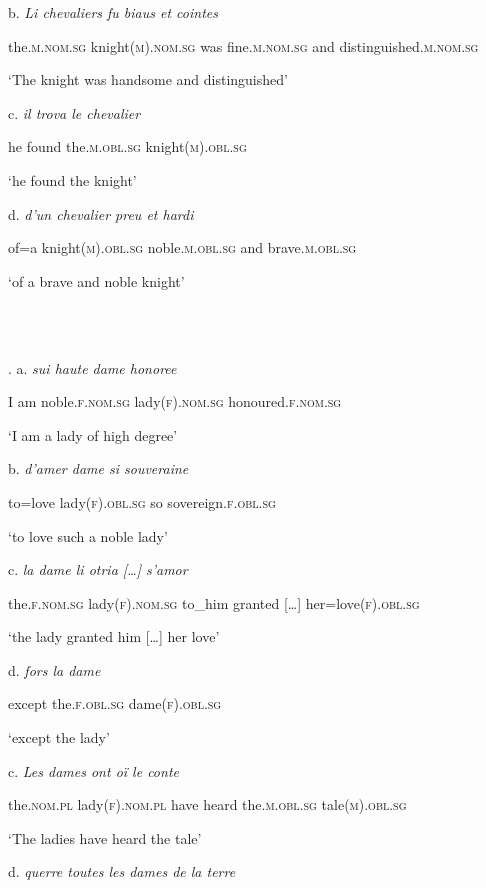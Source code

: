 \documentclass[output=paper]{langscibook}
\begin{document}
b. \textit{Li   chevaliers   fu   biaus      et   cointes}

the.\textsc{m}.\textsc{nom.sg} knight(\textsc{m}).\textsc{nom.sg} was fine.\textsc{m.nom.sg} and distinguished.\textsc{m.nom.sg}

‘The knight was handsome and distinguished’

c. \textit{il  trova   le   chevalier}

he   found   the.\textsc{m.obl.sg} knight(\textsc{m}).\textsc{obl.sg}

‘he found the knight’

d. \textit{d’un   chevalier   preu     et   hardi}

of=a   knight(\textsc{m).obl.sg}   noble.\textsc{m.obl.sg}   and   brave.\textsc{m}.\textsc{obl.sg}

‘of a brave and noble knight’

\ea%
    \label{ex:key:7}
    \gll \\
         \\
    \glt
    \z %

        . a. \textit{sui   haute     dame     honoree}

I am noble.\textsc{f.nom.sg} lady\textsc{(f).nom.sg} honoured.\textsc{f.nom.sg}

‘I am a lady of high degree’

b. \textit{d’amer     dame     si souveraine}

to=love   lady\textsc{(f).obl.sg}   so sovereign.\textsc{f.obl.sg}

‘to love such a noble lady’

c. \textit{la dame li otria […] s’amor}

the.\textsc{f.nom.sg} lady\textsc{(f).nom.sg} to\_him granted \textsc{[…]} her=love(\textsc{f).obl.sg}

‘the lady granted him […] her love’

d. \textit{fors la dame}

except the.\textsc{f.obl.sg} dame\textsc{(f).obl.sg}

‘except the lady’

c. \textit{Les     dames     ont oï le conte} 

the.\textsc{nom.pl}   lady(\textsc{f).nom.pl}   have heard the.\textsc{m.obl.sg} tale(\textsc{m).obl.sg} 

‘The ladies have heard the tale’

d. \textit{querre   toutes     les     dames     de la terre}
\end{document}
